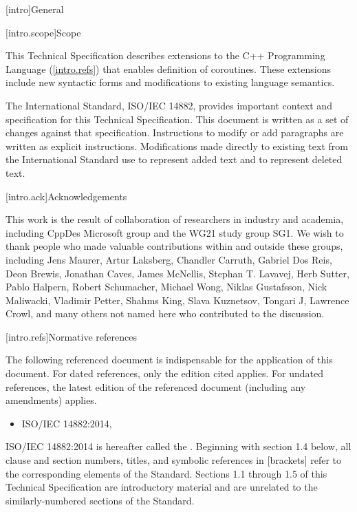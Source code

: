 
[intro]{General}

[intro.scope]{Scope}

\pnum
This Technical Specification describes extensions to the C++ 
Programming Language (\ref{intro.refs}) that
enables definition of coroutines. These extensions include 
new syntactic forms and modifications to existing language semantics.

\pnum
The International Standard, ISO/IEC 14882, provides important context
and specification for this Technical Specification. This document is 
written as a set of changes against that specification. Instructions
to modify or add paragraphs are written as explicit instructions. 
Modifications made directly to existing text from the International
Standard use  to represent added text and
 to represent deleted text.

[intro.ack]{Acknowledgements}

This work is the result of collaboration of researchers in industry and academia, including CppDes Microsoft group and the WG21 study group SG1. We wish to thank people who made valuable contributions within and outside these groups, including Jens Maurer, Artur Laksberg, Chandler Carruth, Gabriel Dos Reis, Deon Brewis, Jonathan Caves, James McNellis, Stephan T. Lavavej, Herb Sutter, Pablo Halpern, Robert Schumacher, Michael Wong, Niklas Gustafsson, Nick Maliwacki, Vladimir Petter, Shahms King, Slava Kuznetsov, Tongari J, Lawrence Crowl, and many others not named here who contributed to
the discussion.

[intro.refs]{Normative references}

\pnum
The following referenced document is indispensable for the
application of this document. For dated references, only the
edition cited applies. For undated references, the latest edition
of the referenced document (including any amendments) applies.

\begin{itemize}
\item ISO/IEC 14882:2014, 
\end{itemize}

ISO/IEC 14882:2014 is hereafter called the .
%
Beginning with section 1.4 below, all clause and section numbers, titles,
and symbolic references in [brackets] refer to the corresponding elements of the \Cpp Standard. Sections 1.1 through 1.5 of this Technical
Specification are introductory material and are unrelated to the similarly-numbered sections of the \Cpp Standard.

